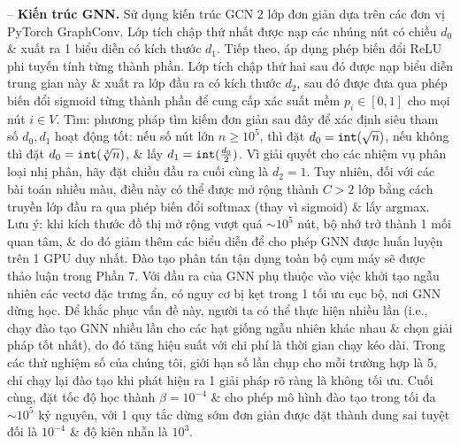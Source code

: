 \documentclass{article}
\begin{document}
\begin{itemize}
    -- {\bf Kiến trúc GNN.} Sử dụng kiến trúc GCN 2 lớp đơn giản dựa trên các đơn vị PyTorch GraphConv. Lớp tích chập thứ nhất được nạp các nhúng nút có chiều $d_0$ \& xuất ra 1 biểu diễn có kích thước $d_1$. Tiếp theo, áp dụng phép biến đổi ReLU phi tuyến tính từng thành phần. Lớp tích chập thứ hai sau đó được nạp biểu diễn trung gian này \& xuất ra lớp đầu ra có kích thước $d_2$, sau đó được đưa qua phép biến đổi sigmoid từng thành phần để cung cấp xác suất mềm $p_i\in[0,1]$ cho mọi nút $i\in V$. Tìm: phương pháp tìm kiếm đơn giản sau đây để xác định siêu tham số $d_0,d_1$ hoạt động tốt: nếu số nút lớn $n\ge10^5$, thì đặt $d_0 = {\tt int}(\sqrt{n})$, nếu không thì đặt $d_0 = {\tt int}(\sqrt[3]{n})$, \& lấy $d_1 = {\tt int}(\frac{d_0}{2})$. Vì giải quyết cho các nhiệm vụ phân loại nhị phân, hãy đặt chiều đầu ra cuối cùng là $d_2 = 1$. Tuy nhiên, đối với các bài toán nhiều màu, điều này có thể được mở rộng thành $C > 2$ lớp bằng cách truyền lớp đầu ra qua phép biến đổi softmax (thay vì sigmoid) \& lấy argmax. Lưu ý: khi kích thước đồ thị mở rộng vượt quá $\sim10^5$ nút, bộ nhớ trở thành 1 mối quan tâm, \& do đó giảm thêm các biểu diễn để cho phép GNN được huấn luyện trên 1 GPU duy nhất. Đào tạo phân tán tận dụng toàn bộ cụm máy sẽ được thảo luận trong Phần 7. Với đầu ra của GNN phụ thuộc vào việc khởi tạo ngẫu nhiên các vectơ đặc trưng ẩn, có nguy cơ bị kẹt trong 1 tối ưu cục bộ, nơi GNN dừng học. Để khắc phục vấn đề này, người ta có thể thực hiện nhiều lần (i.e., chạy đào tạo GNN nhiều lần cho các hạt giống ngẫu nhiên khác nhau \& chọn giải pháp tốt nhất), do đó tăng hiệu suất với chi phí là thời gian chạy kéo dài. Trong các thử nghiệm số của chúng tôi, giới hạn số lần chụp cho mỗi trường hợp là 5, chỉ chạy lại đào tạo khi phát hiện ra 1 giải pháp rõ ràng là không tối ưu. Cuối cùng, đặt tốc độ học thành $\beta = 10^{-4}$ \& cho phép mô hình đào tạo trong tối đa $\sim10^5$ kỷ nguyên, với 1 quy tắc dừng sớm đơn giản được đặt thành dung sai tuyệt đối là $10^{-4}$ \& độ kiên nhẫn là $10^3$.


\end{itemize}
\end{document}
